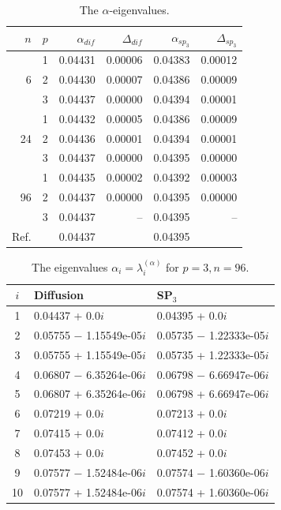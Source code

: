 \documentclass[a4paper]{jpconf}
\begin{document}
\begin{table}[h]
\caption{The $\alpha$-eigenvalues.}
\label{tab:hwr_alpha_del}
\begin{center}
\begin{tabular}{rrrrrr}
\hline
$n$ & $p$ & $\alpha_{dif}$ & $\Delta_{dif}$ &$\alpha_{sp_3}$& $\Delta_{sp_3}$ \\
\hline
	& 1	&0.04431 & 0.00006 & 0.04383 & 0.00012\\
6	& 2	&0.04430 & 0.00007 & 0.04386 & 0.00009\\
	& 3	&0.04437 & 0.00000 & 0.04394 & 0.00001\\ 
\hline
	& 1	&0.04432 & 0.00005 & 0.04386 & 0.00009\\
24& 2	&0.04436 & 0.00001 & 0.04394 & 0.00001\\
	& 3	&0.04437 & 0.00000 & 0.04395 & 0.00000\\ 
\hline
	& 1	&0.04435 & 0.00002 & 0.04392 & 0.00003\\
96& 2	&0.04437 & 0.00000 & 0.04395 & 0.00000\\
	& 3	&0.04437 & --      & 0.04395 & -- \\ 
\hline
Ref.& & 0.04437 & & 0.04395 \\ 
\hline
\end{tabular}
\end{center}
\end{table}

\begin{table}[h]
\caption{The eigenvalues $\alpha_i=\lambda_i^{(\alpha)}$ for $p=3, n=96$.}
\label{tab:hwr_alpha_del_10}
\begin{center}
\begin{tabular}{c l l}
\hline
$i$ & Diffusion & SP$_3$ \\
\hline
1 &0.04437 + 0.0$i$     		&0.04395 + 0.0$i$ \\
2 &0.05755 $-$ 1.15549e-05$i$ 	&0.05735 $-$ 1.22333e-05$i$ \\
3 &0.05755 + 1.15549e-05$i$   	&0.05735 + 1.22333e-05$i$ \\
4 &0.06807 $-$ 6.35264e-06$i$   &0.06798 $-$ 6.66947e-06$i$ \\
5 &0.06807 + 6.35264e-06$i$     &0.06798 + 6.66947e-06$i$ \\
6 &0.07219 + 0.0$i$             &0.07213 + 0.0$i$ \\
7 &0.07415 + 0.0$i$             &0.07412 + 0.0$i$ \\
8 &0.07453 + 0.0$i$          	&0.07452 + 0.0$i$ \\
9 &0.07577 $-$ 1.52484e-06$i$   &0.07574 $-$ 1.60360e-06$i$ \\
10&0.07577 + 1.52484e-06$i$     &0.07574 + 1.60360e-06$i$ \\
\hline
\end{tabular}
\end{center}
\end{table}
\end{document}
